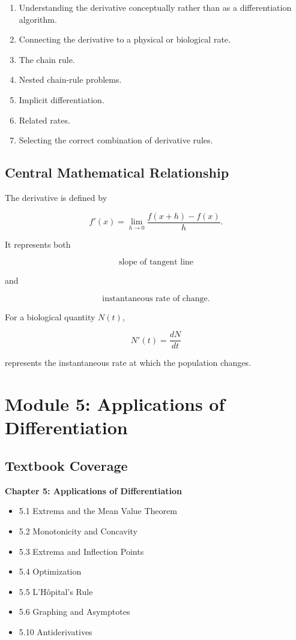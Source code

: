 \documentclass[11pt]{article}
\begin{document}
\begin{enumerate}
    \item Understanding the derivative conceptually rather than as a
          differentiation algorithm.
    \item Connecting the derivative to a physical or biological rate.
    \item The chain rule.
    \item Nested chain-rule problems.
    \item Implicit differentiation.
    \item Related rates.
    \item Selecting the correct combination of derivative rules.
\end{enumerate}

\subsection{Central Mathematical Relationship}

The derivative is defined by

\[
f'(x)
=
\lim_{h\to 0}
\frac{f(x+h)-f(x)}{h}.
\]

It represents both

\[
\boxed{\text{slope of tangent line}}
\]

and

\[
\boxed{\text{instantaneous rate of change}}.
\]

For a biological quantity $N(t)$,

\[
N'(t)=\frac{dN}{dt}
\]

represents the instantaneous rate at which the population changes.

\section{Module 5: Applications of Differentiation}

\subsection{Textbook Coverage}

\textbf{Chapter 5: Applications of Differentiation}

\begin{itemize}
    \item 5.1 Extrema and the Mean Value Theorem
    \item 5.2 Monotonicity and Concavity
    \item 5.3 Extrema and Inflection Points
    \item 5.4 Optimization
    \item 5.5 L'H\^opital's Rule
    \item 5.6 Graphing and Asymptotes
    \item 5.10 Antiderivatives
\end{itemize}
\end{document}
